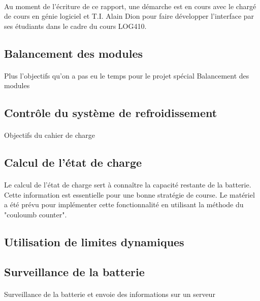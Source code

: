 		\paragraph{}
		Au moment de l'écriture de ce rapport, une démarche est en cours avec le chargé de cours en génie logiciel et T.I. Alain Dion pour faire développer l'interface par ses étudiants dans le cadre du cours LOG410.

	\subsection{Balancement des modules}

		\paragraph{}
		Plus l'objectifs qu'on a pas eu le temps pour le projet spécial Balancement des modules

	\subsection{Contrôle du système de refroidissement}

		\paragraph{}
		Objectifs du cahier de charge

	\subsection{Calcul de l’état de charge}

		\paragraph{}
		Le calcul de l'état de charge sert à connaître la capacité restante de la batterie. Cette information est essentielle pour une bonne stratégie de course. Le matériel a été prévu pour implémenter cette fonctionnalité en utilisant la méthode du "couloumb counter".

	\subsection{Utilisation de limites dynamiques}

		\paragraph{}

	\subsection{Surveillance de la batterie}

		\paragraph{}
		Surveillance de la batterie et envoie des informations sur un serveur



